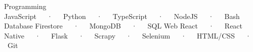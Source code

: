 

\begin{cvtechnicals}
  \cvtechnical %
    {Programming} %
    {JavaScript~~~·~~~Python~~~·~~~TypeScript~~~·~~~NodeJS~~~·~~~Bash} %
    {Database} %
    {Firestore~~~·~~~MongoDB~~~·~~~SQL} %
    {Web} %
    {React~~~·~~~React Native~~~·~~~Flask~~~·~~~Scrapy~~~·~~~Selenium~~~·~~~HTML/CSS~~~·~~~Git} %
\end{cvtechnicals}